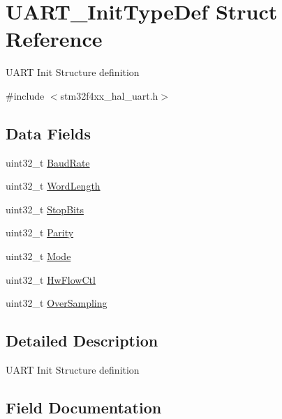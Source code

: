 \hypertarget{struct_u_a_r_t___init_type_def}{}\section{U\+A\+R\+T\+\_\+\+Init\+Type\+Def Struct Reference}
\label{struct_u_a_r_t___init_type_def}


U\+A\+RT Init Structure definition ~\newline
  




{\ttfamily \#include $<$stm32f4xx\+\_\+hal\+\_\+uart.\+h$>$}

\subsection*{Data Fields}
\begin{DoxyCompactItemize}
\item 
uint32\+\_\+t \mbox{\hyperlink{struct_u_a_r_t___init_type_def_aaad609733f3fd8146c8745e953a91b2a}{Baud\+Rate}}
\item 
uint32\+\_\+t \mbox{\hyperlink{struct_u_a_r_t___init_type_def_ae5e60b9a021fe0009588fc86c7584a5a}{Word\+Length}}
\item 
uint32\+\_\+t \mbox{\hyperlink{struct_u_a_r_t___init_type_def_a8394ba239444e3e5fe1ada1c37cb1019}{Stop\+Bits}}
\item 
uint32\+\_\+t \mbox{\hyperlink{struct_u_a_r_t___init_type_def_a1d60a99b8f3965f01ab23444b154ba79}{Parity}}
\item 
uint32\+\_\+t \mbox{\hyperlink{struct_u_a_r_t___init_type_def_a0ffc93ec511ed9cf1663f6939bd3e839}{Mode}}
\item 
uint32\+\_\+t \mbox{\hyperlink{struct_u_a_r_t___init_type_def_a0a933d213b17470c582c8fec23a24d09}{Hw\+Flow\+Ctl}}
\item 
uint32\+\_\+t \mbox{\hyperlink{struct_u_a_r_t___init_type_def_a35770b237370fda7fd0fabad22898490}{Over\+Sampling}}
\end{DoxyCompactItemize}


\subsection{Detailed Description}
U\+A\+RT Init Structure definition ~\newline
 

\subsection{Field Documentation}
\mbox{\label{struct_u_a_r_t___init_type_def_aaad609733f3fd8146c8745e953a91b2a}} 
